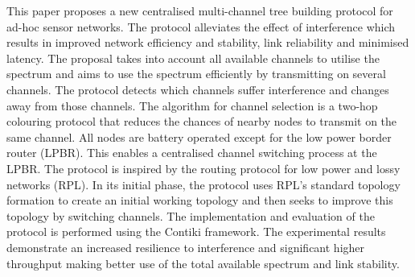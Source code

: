 This paper proposes a new centralised multi-channel tree building protocol for ad-hoc sensor networks. The protocol alleviates the effect of interference which results in improved network efficiency and stability, link reliability and minimised latency. 
        The proposal takes into account all available channels to utilise the spectrum and aims to use the spectrum efficiently by transmitting on several channels. The protocol detects which channels suffer interference and changes away from those channels. The algorithm for channel selection is a two-hop colouring protocol that reduces the chances of nearby nodes to transmit on the same channel. 
        All nodes are battery operated except for the low power border router (LPBR). This enables a centralised channel switching process at the LPBR. The protocol is inspired by the routing protocol for low power and lossy networks (RPL). In its initial phase, the protocol uses RPL's standard topology formation to create an initial working topology and then seeks to improve this topology by switching channels.
        The implementation and evaluation of the protocol is performed using the Contiki framework.
The experimental results demonstrate an increased resilience to interference and significant higher throughput making better use of the total available spectrum and link stability.